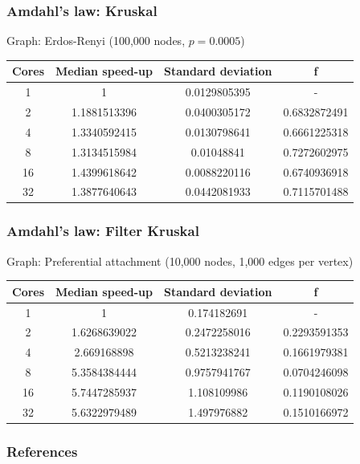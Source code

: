\documentclass{beamer}
\begin{document}
\begin{frame}

    \frametitle{Amdahl's law: Kruskal}

	Graph: Erdos-Renyi (100,000 nodes, $p=0.0005$)

	\begin{center}
		\begin{tabular}{||c c c c||} 
			\hline
            Cores & Median speed-up & Standard deviation & f \\ [0.5ex] 
			\hline\hline
            1 & 1 & 0.0129805395 & - \\
			\hline
            2 & 1.1881513396 & 0.0400305172 & 0.6832872491 \\
			\hline
            4 & 1.3340592415 & 0.0130798641 & 0.6661225318 \\
			\hline
            8 & 1.3134515984 & 0.01048841 & 0.7272602975 \\
			\hline
            16 & 1.4399618642 & 0.0088220116 & 0.6740936918 \\
			\hline
            32 & 1.3877640643 & 0.0442081933 & 0.7115701488 \\ [1ex] 
			\hline
		\end{tabular}
	\end{center}

\end{frame}

\begin{frame}

    \frametitle{Amdahl's law: Filter Kruskal}

	Graph: Preferential attachment (10,000 nodes, 1,000 edges per vertex)

	\begin{center}
		\begin{tabular}{||c c c c||} 
			\hline
            Cores & Median speed-up & Standard deviation & f \\ [0.5ex] 
			\hline\hline
			1 & 1 & 0.174182691 & - \\
			\hline
			2 & 1.6268639022 & 0.2472258016 & 0.2293591353 \\
			\hline
			4 & 2.669168898	& 0.5213238241 & 0.1661979381 \\
			\hline
			8 & 5.3584384444 & 0.9757941767 & 0.0704246098 \\
			\hline
			16 & 5.7447285937 & 1.108109986 & 0.1190108026 \\
			\hline
			32 & 5.6322979489 & 1.497976882 & 0.1510166972 \\ [1ex] 
			\hline
		\end{tabular}
	\end{center}

    \nocite{Osipov:2009:FMS:2791220.2791225}
    \nocite{bader2006fast}
    \nocite{chung1996parallel}

\end{frame}

\begin{frame}
    \printbibliography
    \frametitle{References}
\end{frame} 
\end{document}
